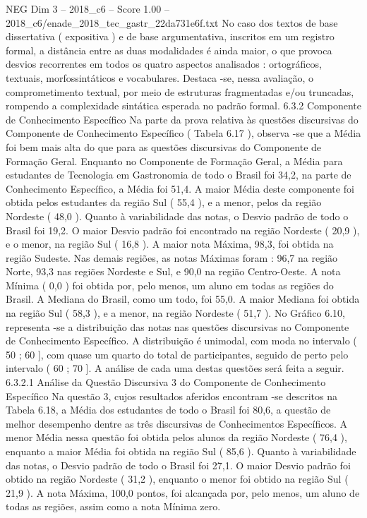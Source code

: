 \begin{textsample}{NEG Dim 3 – 2018\_c6 – Score 1.00 – 2018\_c6/enade\_2018\_tec\_gastr\_22da731e6f.txt}
No caso dos textos de base dissertativa ( expositiva ) e de base argumentativa, inscritos em um registro formal, a distância entre as duas modalidades é ainda maior, o que provoca desvios recorrentes em todos os quatro aspectos analisados : ortográficos, textuais, morfossintáticos e vocabulares.
Destaca -se, nessa avaliação, o comprometimento textual, por meio de estruturas fragmentadas e/ou truncadas, rompendo a complexidade sintática esperada no padrão formal. 6.3.2 Componente de Conhecimento Específico Na parte da prova relativa às questões discursivas do Componente de Conhecimento Específico ( Tabela 6.17 ), observa -se que a Média foi bem mais alta do que para as questões discursivas do Componente de Formação Geral.
Enquanto no Componente de Formação Geral, a Média para estudantes de Tecnologia em Gastronomia de todo o Brasil foi 34,2, na parte de Conhecimento Específico, a Média foi 51,4.
A maior Média deste componente foi obtida pelos estudantes da região Sul ( 55,4 ), e a menor, pelos da região Nordeste ( 48,0 ).
Quanto à variabilidade das notas, o Desvio padrão de todo o Brasil foi 19,2.
O maior Desvio padrão foi encontrado na região Nordeste ( 20,9 ), e o menor, na região Sul ( 16,8 ).
A maior nota Máxima, 98,3, foi obtida na região Sudeste.
Nas demais regiões, as notas Máximas foram : 96,7 na região Norte, 93,3 nas regiões Nordeste e Sul, e 90,0 na região Centro-Oeste.
A nota Mínima ( 0,0 ) foi obtida por, pelo menos, um aluno em todas as regiões do Brasil.
A Mediana do Brasil, como um todo, foi 55,0.
A maior Mediana foi obtida na região Sul ( 58,3 ), e a menor, na região Nordeste ( 51,7 ).
No Gráfico 6.10, representa -se a distribuição das notas nas questões discursivas no Componente de Conhecimento Específico.
A distribuição é unimodal, com moda no intervalo ( 50 ; 60 ], com quase um quarto do total de participantes, seguido de perto pelo intervalo ( 60 ; 70 ].
A análise de cada uma destas questões será feita a seguir. 6.3.2.1 Análise da Questão Discursiva 3 do Componente de Conhecimento Específico Na questão 3, cujos resultados aferidos encontram -se descritos na Tabela 6.18, a Média dos estudantes de todo o Brasil foi 80,6, a questão de melhor desempenho dentre as três discursivas de Conhecimentos Específicos.
A menor Média nessa questão foi obtida pelos alunos da região Nordeste ( 76,4 ), enquanto a maior Média foi obtida na região Sul ( 85,6 ).
Quanto à variabilidade das notas, o Desvio padrão de todo o Brasil foi 27,1.
O maior Desvio padrão foi obtido na região Nordeste ( 31,2 ), enquanto o menor foi obtido na região Sul ( 21,9 ).
A nota Máxima, 100,0 pontos, foi alcançada por, pelo menos, um aluno de todas as regiões, assim como a nota Mínima zero.

\end{textsample}
